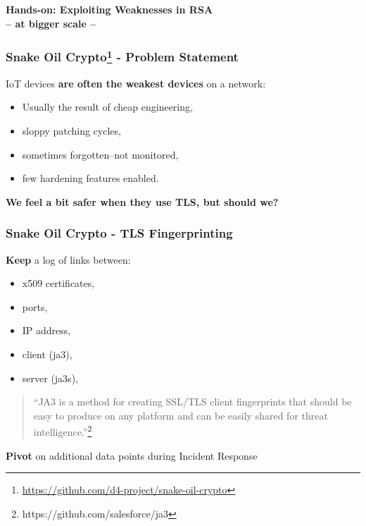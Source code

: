 \documentclass{beamer}
\begin{document}
\begin{frame}
  \begin{center}
    {\bf Hands-on: Exploiting Weaknesses in RSA}\\
    {\bf -- at bigger scale --}\\
  \end{center}
\end{frame}

\begin{frame}
  \frametitle{Snake Oil Crypto\footnote{\url{https://github.com/d4-project/snake-oil-crypto}} - Problem Statement}
  IoT devices {\bf are often the weakest devices} on a network:
        \begin{itemize}
        \item Usually the result of cheap engineering,
        \item sloppy patching cycles,
        \item sometimes forgotten--not monitored,
        \item few hardening features enabled.
        \end{itemize}

        \vspace{10 mm} 

{\bf We feel a bit safer when they use TLS, but should we?}

\end{frame}

\begin{frame}
  \frametitle{Snake Oil Crypto - TLS Fingerprinting}
        {\bf Keep} a log of links between:
        \begin{itemize}
          \item x509 certificates,
          \item ports,
          \item IP address,
          \item client (ja3),
          \item server (ja3s),
        \end{itemize}
        \begin{quote}
        ``JA3 is a method for creating SSL/TLS client fingerprints that should be easy to produce on any platform and can be easily shared for threat intelligence.''\footnote{https://github.com/salesforce/ja3}
        \end{quote}

         {\bf Pivot} on additional data points during Incident Response 
\end{frame}
\end{document}
